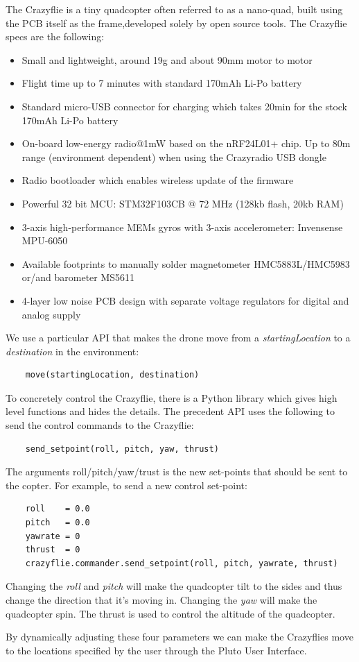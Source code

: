 The Crazyflie is a tiny quadcopter often referred to as a nano-quad, built using the PCB itself as the frame,developed solely by open source tools. The Crazyflie specs are the following:


\begin{itemize}
\item {Small and lightweight, around 19g and about 90mm motor to motor
}
\item {Flight time up to 7 minutes with standard 170mAh Li-Po battery
}
\item {Standard micro-USB connector for charging which takes 20min for the stock 170mAh Li-Po battery
}
\item {On-board low-energy radio@1mW based on the nRF24L01+ chip. Up to 80m range (environment dependent) when using the Crazyradio USB dongle}
\item{Radio bootloader which enables wireless update of the firmware
}
\item{Powerful 32 bit MCU: STM32F103CB @ 72 MHz (128kb flash, 20kb RAM)
}
\item{3-axis high-performance MEMs gyros with 3-axis accelerometer: Invensense MPU-6050
}
\item{Available footprints to manually solder magnetometer HMC5883L/HMC5983 or/and barometer MS5611
}
\item{4-layer low noise PCB design with separate voltage regulators for digital and analog supply
}
\end{itemize}

We use a particular API that makes the drone move from a \textit{startingLocation} to a \textit{destination} in the environment:
\\

\begin{lstlisting}
	move(startingLocation, destination)
\end{lstlisting}

To concretely control the Crazyflie, there is a Python library which gives high level functions and hides the details.
The precedent API uses the following to send the control commands to the Crazyflie:

\begin{lstlisting}
	send_setpoint(roll, pitch, yaw, thrust)
\end{lstlisting}

The arguments roll/pitch/yaw/trust is the new set-points that should be sent to the copter.
For example, to send a new control set-point:
\\

\begin{lstlisting}
	roll    = 0.0
    pitch   = 0.0
    yawrate = 0
    thrust  = 0
    crazyflie.commander.send_setpoint(roll, pitch, yawrate, thrust)
\end{lstlisting}

Changing the \textit{roll} and \textit{pitch} will make the quadcopter tilt to the sides and thus change the direction that it's moving in.
Changing the \textit{yaw} will make the quadcopter spin.
The thrust is used to control the altitude of the quadcopter.

By dynamically adjusting these four parameters we can make the Crazyflies move to the locations specified by the user through the Pluto User Interface.